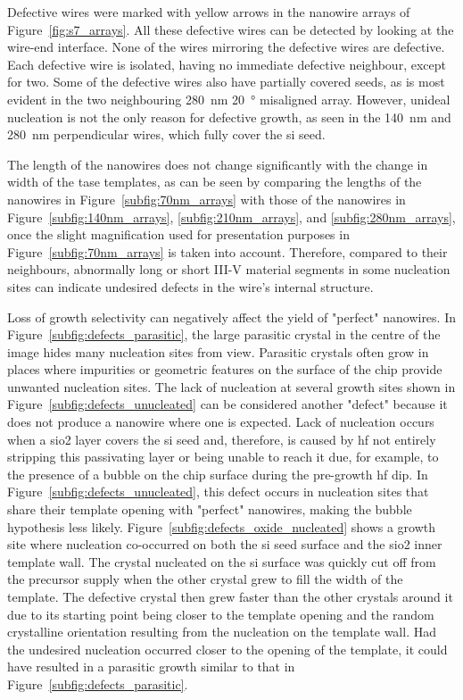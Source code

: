Defective wires were marked with yellow arrows in the nanowire arrays of Figure~\ref{fig:s7_arrays}. All these defective wires can be detected by looking at the wire-end interface. None of the wires mirroring the defective wires are defective. Each defective wire is isolated, having no immediate defective neighbour, except for two. Some of the defective wires also have partially covered seeds, as is most evident in the two neighbouring \qty{280}{\nano\metre} \qty{20}{\degree} misaligned array. However, unideal nucleation is not the only reason for defective growth, as seen in the \qty{140}{\nano\metre} and \qty{280}{\nano\metre} perpendicular wires, which fully cover the \acl{si} seed.

The length of the nanowires does not change significantly with the change in width of the \acs{tase} templates, as can be seen by comparing the lengths of the nanowires in Figure~\ref{subfig:70nm_arrays} with those of the nanowires in Figure~\ref{subfig:140nm_arrays}, \ref{subfig:210nm_arrays}, and \ref{subfig:280nm_arrays}, once the slight magnification used for presentation purposes in Figure~\ref{subfig:70nm_arrays} is taken into account. Therefore, compared to their neighbours, abnormally long or short III-V material segments in some nucleation sites can indicate undesired defects in the wire's internal structure.

Loss of growth selectivity can negatively affect the yield of "perfect" nanowires. In Figure~\ref{subfig:defects_parasitic}, the large parasitic crystal in the centre of the image hides many nucleation sites from view. Parasitic crystals often grow in places where impurities or geometric features on the surface of the chip provide unwanted nucleation sites. The lack of nucleation at several growth sites shown in Figure~\ref{subfig:defects_unucleated} can be considered another "defect" because it does not produce a nanowire where one is expected. Lack of nucleation occurs when a \acs{sio2} layer covers the \acl{si} seed and, therefore, is caused by \acf{hf} not entirely stripping this passivating layer or being unable to reach it due, for example, to the presence of a bubble on the chip surface during the pre-growth \acs{hf} dip. In Figure~\ref{subfig:defects_unucleated}, this defect occurs in nucleation sites that share their template opening with "perfect" nanowires, making the bubble hypothesis less likely. Figure~\ref{subfig:defects_oxide_nucleated} shows a growth site where nucleation co-occurred on both the \acl{si} seed surface and the \acs{sio2} inner template wall. The crystal nucleated on the \acl{si} surface was quickly cut off from the precursor supply when the other crystal grew to fill the width of the template. The defective crystal then grew faster than the other crystals around it due to its starting point being closer to the template opening and the random crystalline orientation resulting from the nucleation on the template wall. Had the undesired nucleation occurred closer to the opening of the template, it could have resulted in a parasitic growth similar to that in Figure~\ref{subfig:defects_parasitic}.

